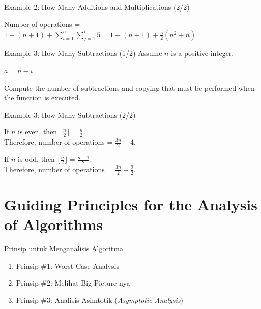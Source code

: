 \documentclass[pdf]{beamer}
\theoremstyle{mystyle}
\begin{document}
\begin{frame}{Example 2: How Many Additions and Multiplications (2/2)}

	
	Number of operations = $1 + (n+1) + \sum_{i=1}^{n}{\sum_{j=1}^{i}{5}} = 1+(n+1)+\frac{5}{2}(n^2+n)$
\end{frame}

\begin{frame}{Example 3: How Many Subtractions (1/2)}
		Assume $n$ is a positive integer.		
		\begin{algorithm}[H]
		\caption{Subtractions}
		\label{algo:subtractions}
		\begin{algorithmic}[1] 
				\State $a = n - i$
			\EndFor
			\EndFunction
		\end{algorithmic}
	\end{algorithm}	
	Compute the number of subtractions and copying that must be performed when the function is executed.
\end{frame}

\begin{frame}{Example 3: How Many Subtractions (2/2)}

	If $n$ is even, then $\lfloor \frac{n}{2} \rfloor = \frac{n}{2}$. \\
	Therefore, number of operations = $\frac{3n}{2}+4$.
	
	\bigskip	
	
	If $n$ is odd, then $\lfloor \frac{n}{2} \rfloor = \frac{n-1}{2}$. \\
	Therefore, number of operations = $\frac{3n}{2}+\frac{9}{2}$.
\end{frame}

\section{Guiding Principles for the Analysis of Algorithms}
\begin{frame}{Prinsip untuk Menganalisis Algoritma}
	\begin{enumerate}
		\item Prinsip \#1: Worst-Case Analysis 
		
		\bigskip		
		
		\item Prinsip \#2: Melihat Big Picture-nya
		
		\bigskip		
		
		\item Prinsip \#3: Analisis Asimtotik (\textit{Asymptotic Analysis})
	\end{enumerate}
\end{frame}
\end{document}
